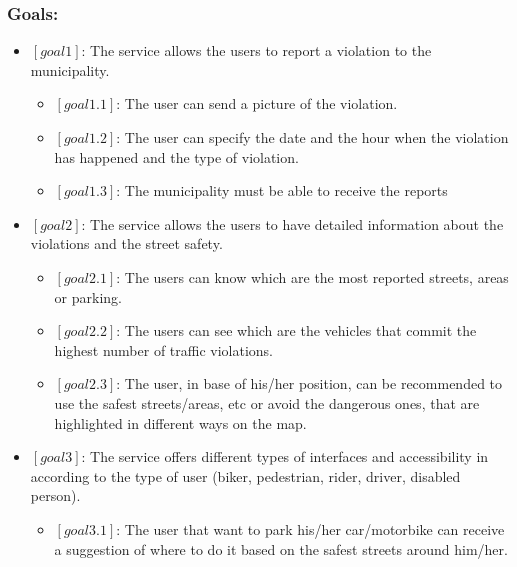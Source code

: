 \documentclass[titlepage]{article}
\begin{document}
\subsubsection{Goals:}
\begin{itemize}
\item $[goal 1]$:  The service allows the users to report a violation to the municipality.
\begin{itemize}

	\item $[goal 1.1]$: The user can send a picture of the 			violation.
	
	\item $[goal 1.2]$: The user can specify the date and the 						hour when the violation has happened 							and the type of violation.
	

	\item $[goal 1.3 ]$: The municipality must be able to     	receive the reports  \\
	
\end{itemize}

\item $[goal 2]$: The service allows the users to have detailed information about the violations and the street safety.
      \begin{itemize}
      	\item $[goal 2.1]$: The users can know which are the 			most reported streets, areas or parking.
      	
      	\item $[goal 2.2]$: The users can see which are the 				vehicles that commit the highest number
		of traffic violations.
		
		\item $[goal 2.3]$: The user, in base of his/her 				position, can be recommended to use the safest 					streets/areas, etc or avoid the dangerous ones, that 			are highlighted in different ways on the map.\\

      \end{itemize}
\item $[goal 3]$: The service offers different types of 						  interfaces and accessibility in according 					  to the type of user (biker, pedestrian, 						  rider, driver, disabled person).
	\begin{itemize}
	\item $[goal 3.1]$: The user that want to park his/her  							car/motorbike can receive a                           						suggestion of where to do it 
						based on the safest streets around 								him/her.\\
	\end{itemize}



\end{itemize}
\end{document}
